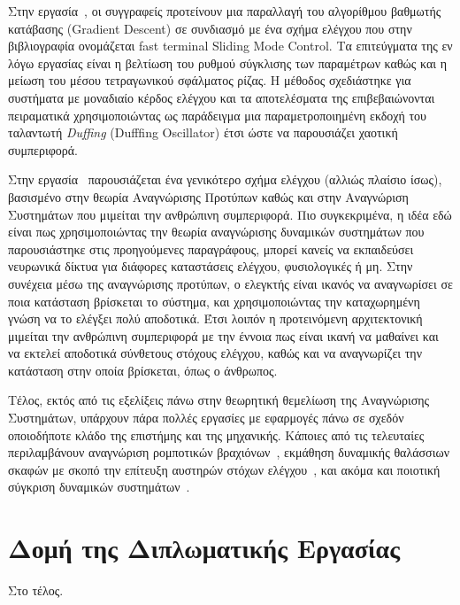 Στην εργασία~\cite{khazaei2017radial}, οι συγγραφείς προτείνουν μια παραλλαγή του αλγορίθμου βαθμωτής κατάβασης (Gradient Descent) σε συνδιασμό με ένα σχήμα ελέγχου που στην βιβλιογραφία ονομάζεται fast terminal Sliding Mode Control. Τα επιτεύγματα της εν λόγω εργασίας είναι η βελτίωση του ρυθμού σύγκλισης των παραμέτρων καθώς και η μείωση του μέσου τετραγωνικού σφάλματος ρίζας. Η μέθοδος σχεδιάστηκε για συστήματα με μοναδιαίο κέρδος ελέγχου και τα αποτελέσματα της επιβεβαιώνονται πειραματικά χρησιμοποιώντας ως παράδειγμα μια παραμετροποιημένη εκδοχή του ταλαντωτή \textit{Duffing} (Dufffing Oscillator) έτσι ώστε να παρουσιάζει χαοτική συμπεριφορά.

Στην εργασία~\cite{yang2017pattern} παρουσιάζεται ένα γενικότερο σχήμα ελέγχου (αλλιώς πλαίσιο ίσως), βασισμένο στην θεωρία Αναγνώρισης Προτύπων καθώς και στην Αναγνώριση Συστημάτων που μιμείται την ανθρώπινη συμπεριφορά. Πιο συγκεκριμένα, η ιδέα εδώ είναι πως χρησιμοποιώντας την θεωρία αναγνώρισης δυναμικών συστημάτων που παρουσιάστηκε στις προηγούμενες παραγράφους, μπορεί κανείς να εκπαιδεύσει νευρωνικά δίκτυα για διάφορες καταστάσεις ελέγχου, φυσιολογικές ή μη. Στην συνέχεια μέσω της αναγνώρισης προτύπων, ο ελεγκτής είναι ικανός να αναγνωρίσει σε ποια κατάσταση βρίσκεται το σύστημα, και χρησιμοποιώντας την καταχωρημένη γνώση να το ελέγξει πολύ αποδοτικά. Έτσι λοιπόν η προτεινόμενη αρχιτεκτονική μιμείται την ανθρώπινη συμπεριφορά με την έννοια πως είναι ικανή να μαθαίνει και να εκτελεί αποδοτικά σύνθετους στόχους ελέγχου, καθώς και να αναγνωρίζει την κατάσταση στην οποία βρίσκεται, όπως ο άνθρωπος. 

Τέλος, εκτός από τις εξελίξεις πάνω στην θεωρητική θεμελίωση της Αναγνώρισης Συστημάτων, υπάρχουν πάρα πολλές εργασίες με εφαρμογές πάνω σε σχεδόν οποιοδήποτε κλάδο της επιστήμης και της μηχανικής. Κάποιες από τις τελευταίες περιλαμβάνουν αναγνώριση ρομποτικών βραχιόνων~\cite{wang2017dynamic}, εκμάθηση δυναμικής θαλάσσιων σκαφών με σκοπό την επίτευξη αυστηρών στόχων ελέγχου~\cite{dai2016neural}, και ακόμα και ποιοτική σύγκριση δυναμικών συστημάτων~\cite{dong2016modeling}.


\section{Δομή της Διπλωματικής Εργασίας}
Στο τέλος.


